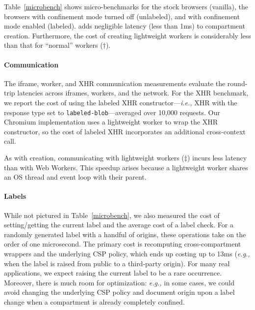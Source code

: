Table~\ref{microbench} shows micro-benchmarks for the stock
browsers (vanilla), the \sys{} browsers with confinement mode turned
off (unlabeled), and with confinement mode enabled (labeled).
%
\sys{} adds negligible latency (less than 1ms) to compartment
creation.
%
Furthermore, the cost of creating lightweight workers is considerably
less than that for ``normal'' workers ($\dagger$).

\paragraph{Communication} The iframe, worker, and XHR communication measurements evaluate the
round-trip latencies across iframes, workers, and the network.
%
For the XHR benchmark, we report the cost of using the labeled XHR
constructor---\emph{i.e.,} XHR with the response type set to
\verb|labeled-blob|---averaged over 10,000 requests.
%
Our Chromium implementation uses a lightweight worker to wrap the XHR
constructor, so the cost of labeled XHR incorporates an additional
cross-context call.

As with creation, communicating with lightweight workers ($\ddagger$)
incurs less latency than with Web Workers.
%
This speedup arises because a lightweight worker shares
 an OS thread and event loop with their parent.
%


\paragraph{Labels} While not pictured in Table~\ref{microbench},
we also measured the cost of setting/getting the current label and the
average cost of a label check.
%
For a randomly generated label with a handful of origins, these
operations take on the order of one microsecond.
%
The primary cost is recomputing cross-compartment wrappers and
the underlying CSP policy, which ends up costing up to 13ms (\emph{e.g.,} when
the label is raised from public to a third-party origin).
%
For many real applications, we expect raising the current label
to be a rare occurrence.
%
Moreover, there is much room for optimization: {\em e.g.,} in some cases,
we could avoid changing the underlying CSP policy and document
origin upon a label change when a compartment is already completely confined.
 
